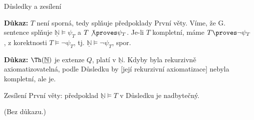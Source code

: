 \documentclass{beamer}
\begin{document}
\begin{frame}{Důsledky a zesílení}
    
    \pause
    
    \pause
    \textbf{Důkaz:}
        $T$ není sporná, tedy splňuje předpoklady První věty. Víme, že G. sentence splňuje $\underline{\mathbb N}\models\psi_T$ a $T\not\proves\psi_T$. Je-li $T$ kompletní, máme $T\proves\neg\psi_T$, z korektnosti $T\models\neg\psi_T$, tj. $\underline{\mathbb N}\models\neg\psi_T$, spor.
    \hfill\qedsymbol
    
    \medskip

    \pause

    \pause
    \textbf{Důkaz:}
    $\Th(\underline{\mathbb N})$ je extenze $Q$, platí v $\underline{\mathbb N}$. Kdyby byla rekurzivně axiomatizovatelná, podle Důsledku by [její rekurzivní axiomatizace] nebyla kompletní, ale je.
    \hfill\qedsymbol

    \medskip

    \pause
    Zesílení První věty: předpoklad $\underline{\mathbb N}\models T$ v Důsledku je nadbytečný.

    \pause

    (Bez důkazu.)

\end{frame}
\end{document}
